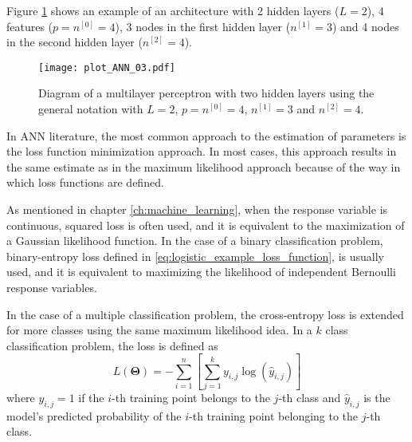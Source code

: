 Figure \ref{fig:theory_ANN_diagram_03} shows an example of an architecture with 2 hidden layers ($L = 2$), 4 features ($p = n^{[0]} = 4$), 3 nodes in the first hidden layer ($n^{[1]} = 3$) and 4 nodes in the second hidden layer ($n^{[2]} = 4$).

\begin{figure}[H]
    \centering
    \texttt{[image: plot\_ANN\_03.pdf]}
    \caption{Diagram of a multilayer perceptron with two hidden layers using the general notation with $L = 2$, $p = n^{[0]} = 4$, $n^{[1]} = 3$ and $n^{[2]} = 4$.}
    \label{fig:theory_ANN_diagram_03}
\end{figure}

In ANN literature, the most common approach to the estimation of parameters is the loss function minimization approach. In most cases, this approach results in the same estimate as in the maximum likelihood approach because of the way in which loss functions are defined.

As mentioned in chapter \ref{ch:machine_learning}, when the response variable is continuous, squared loss is often used, and it is equivalent to the maximization of a Gaussian likelihood function. In the case of a binary classification problem, binary-entropy loss defined in \eqref{eq:logistic_example_loss_function}, is usually used, and it is equivalent to maximizing the likelihood of independent Bernoulli response variables.

In the case of a multiple classification problem, the cross-entropy loss is extended for more classes using the same maximum likelihood idea. In a $k$ class classification problem, the loss is defined as
\begin{equation}
  L(\boldsymbol{\Theta}) = - \sum_{i = 1}^n \left[ \sum_{j = 1}^k y_{i,j} \log{\left( \hat{y}_{i,j} \right)}  \right]
\end{equation}
where $y_{i,j} = 1$ if the $i$-th training point belongs to the $j$-th class and $\hat{y}_{i,j}$ is the model's predicted probability of the $i$-th training point belonging to the $j$-th class.

